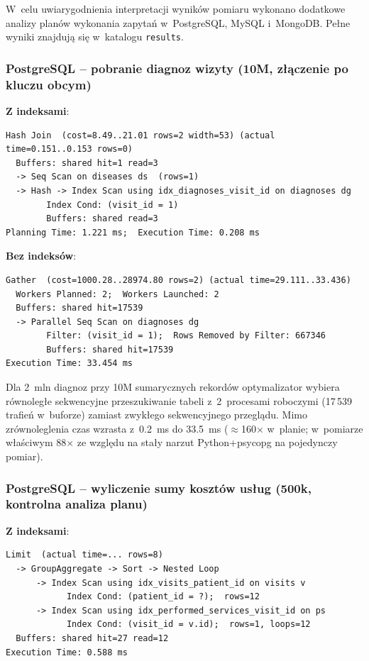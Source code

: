 \documentclass[12pt,a4paper]{article}
\begin{document}
W~celu uwiarygodnienia interpretacji wyników pomiaru wykonano dodatkowe analizy planów wykonania zapytań w~PostgreSQL, MySQL i~MongoDB. Pełne wyniki znajdują się w~katalogu \texttt{results}.

\subsubsection{PostgreSQL -- pobranie diagnoz wizyty (10M, złączenie po kluczu obcym)}

\textbf{Z indeksami}:
\begin{lstlisting}[basicstyle=\ttfamily\scriptsize]
Hash Join  (cost=8.49..21.01 rows=2 width=53) (actual time=0.151..0.153 rows=0)
  Buffers: shared hit=1 read=3
  -> Seq Scan on diseases ds  (rows=1)
  -> Hash -> Index Scan using idx_diagnoses_visit_id on diagnoses dg
        Index Cond: (visit_id = 1)
        Buffers: shared read=3
Planning Time: 1.221 ms;  Execution Time: 0.208 ms
\end{lstlisting}

\textbf{Bez indeksów}:
\begin{lstlisting}[basicstyle=\ttfamily\scriptsize]
Gather  (cost=1000.28..28974.80 rows=2) (actual time=29.111..33.436)
  Workers Planned: 2;  Workers Launched: 2
  Buffers: shared hit=17539
  -> Parallel Seq Scan on diagnoses dg
        Filter: (visit_id = 1);  Rows Removed by Filter: 667346
        Buffers: shared hit=17539
Execution Time: 33.454 ms
\end{lstlisting}

Dla 2~mln diagnoz przy 10M sumarycznych rekordów optymalizator wybiera równoległe sekwencyjne przeszukiwanie tabeli z~2~procesami roboczymi (17\,539 trafień w~buforze) zamiast zwykłego sekwencyjnego przeglądu. Mimo zrównoleglenia czas wzrasta z~0.2~ms do 33.5~ms ($\approx$160$\times$ w~planie; w~pomiarze właściwym 88$\times$ ze względu na stały narzut Python+psycopg na pojedynczy pomiar).

\subsubsection{PostgreSQL -- wyliczenie sumy kosztów usług (500k, kontrolna analiza planu)}
\label{sec:explain_500k}

\textbf{Z indeksami}:
\begin{lstlisting}[basicstyle=\ttfamily\scriptsize]
Limit  (actual time=... rows=8)
  -> GroupAggregate -> Sort -> Nested Loop
      -> Index Scan using idx_visits_patient_id on visits v
            Index Cond: (patient_id = ?);  rows=12
      -> Index Scan using idx_performed_services_visit_id on ps
            Index Cond: (visit_id = v.id);  rows=1, loops=12
  Buffers: shared hit=27 read=12
Execution Time: 0.588 ms
\end{lstlisting}
\end{document}
